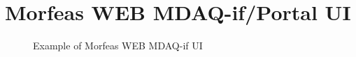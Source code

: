\section{Morfeas WEB MDAQ-if/Portal UI}



\begin{figure}[h]
\centering
	\caption{Example of Morfeas WEB MDAQ-if UI}
	\label{fig:MDAQ-if_UI}
\end{figure}